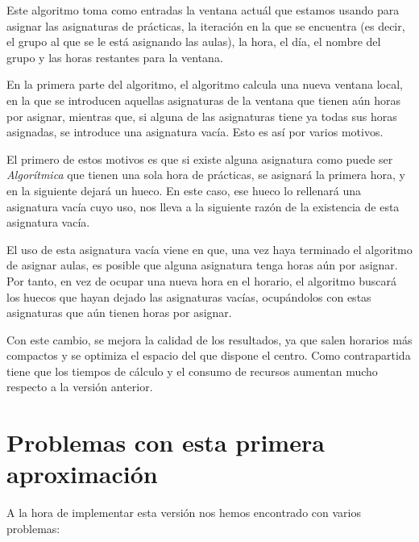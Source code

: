 Este algoritmo toma como entradas la ventana actuál que estamos usando para asignar las asignaturas de prácticas, la iteración en la que se encuentra (es decir, el grupo al que se le está asignando las aulas), la hora, el día, el nombre del grupo y las horas restantes para la ventana.

En la primera parte del algoritmo, el algoritmo calcula una nueva ventana local, en la que se introducen aquellas asignaturas de la ventana que tienen aún horas por asignar, mientras que, si alguna de las asignaturas tiene ya todas sus horas asignadas, se introduce una asignatura vacía. Esto es así por varios motivos. 

El primero de estos motivos es que si existe alguna asignatura como puede ser \textit{Algorítmica} que tienen una sola hora de prácticas, se asignará la primera hora, y en la siguiente dejará un hueco. En este caso, ese hueco lo rellenará una asignatura vacía cuyo uso, nos lleva a la siguiente razón de la existencia de esta asignatura vacía.

El uso de esta asignatura vacía viene en que, una vez haya terminado el algoritmo de asignar aulas, es posible que alguna asignatura tenga horas aún por asignar. Por tanto, en vez de ocupar una nueva hora en el horario, el algoritmo buscará los huecos que hayan dejado las asignaturas vacías, ocupándolos con estas asignaturas que aún tienen horas por asignar.

Con este cambio, se mejora la calidad de los resultados, ya que salen horarios más compactos y se optimiza el espacio del que dispone el centro. Como contrapartida tiene que los tiempos de cálculo y el consumo de recursos aumentan mucho respecto a la versión anterior.

\section{Problemas con esta primera aproximación}
A la hora de implementar esta versión nos hemos encontrado con varios problemas:

